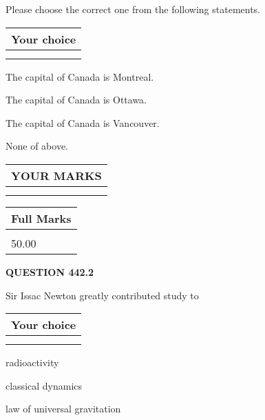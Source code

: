 \documentclass[12pt]{article}
\begin{document}
  
Please choose the correct one from the following statements.
  
  
\noindent\hspace{3.0in} \begin{tabular}{|l|}
\hline
Your choice \\
\hline
 \\ 
 \\ 
\hline
\end{tabular}
  
  
 
 
The capital of Canada is Montreal.
 
 
The capital of Canada is Ottawa.
 
 
The capital of Canada is Vancouver.
 
 
 None of above.
 
 
  
\vspace{0.2in}
  
\noindent\begin{tabular}{|l|}
\hline
 YOUR MARKS  \\
\hline
 \\ 
 \\ 
\hline
\end{tabular}
\hspace{0.05in} \begin{tabular}{|l|}
\hline
 Full Marks  \\
\hline
 \\ 
50.00 \\
\hline
\end{tabular}
{\textbf{\Large{QUESTION
442.2 
}}}
  
  
Sir Issac Newton greatly contributed study to
  
  
\noindent\hspace{3.0in} \begin{tabular}{|l|}
\hline
Your choice \\
\hline
 \\ 
 \\ 
\hline
\end{tabular}
  
  
 
 
radioactivity
 
 
classical dynamics
 
 
law of universal gravitation
 
\end{document}
